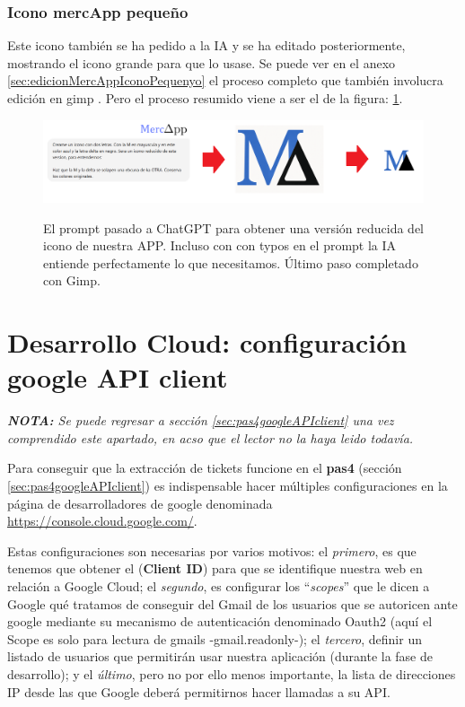 \documentclass[a4paper,12pt]{report}
\begin{document}
	
	\subsubsection{Icono mercApp pequeño}
	\label{sec:iconoMercappPetitMEMORIAPPAL}
	Este icono también se ha pedido a la IA y se ha editado posteriormente, mostrando el icono grande para que lo usase. Se puede ver en el anexo \ref{sec:edicionMercAppIconoPequenyo} el proceso completo que también involucra edición en gimp . Pero el proceso resumido viene a ser el de la figura: \ref{fig:mercappResumit}.
		
		
	\FloatBarrier
	\setlength{\belowcaptionskip}{3pt}
	\begin{figure}[H]
		\centering
		\caption{El prompt pasado a ChatGPT para obtener una versión reducida del icono de nuestra APP. Incluso con con typos en el prompt la IA entiende perfectamente lo que necesitamos. Último paso completado con Gimp.}
		\includegraphics[width=1\linewidth]{img/mercappResumit}
		\label{fig:mercappResumit}
	\end{figure}
	\FloatBarrier
		
		
		
	\section{Desarrollo Cloud: configuración google API client}
	\label{sec:desarrolloCloudGoogleApi}
	
	\noindent \textit{\textbf{NOTA:} Se puede regresar a sección \ref{sec:pas4googleAPIclient} una vez comprendido este apartado, en acso que el lector no la haya leido todavía.}
	
	Para conseguir que la extracción de tickets funcione en el \textbf{pas4} (sección \ref{sec:pas4googleAPIclient}) es indispensable hacer múltiples configuraciones en la página de desarrolladores de google denominada \href{https://console.cloud.google.com/}{https://console.cloud.google.com/}. 
	
	Estas configuraciones son necesarias por varios motivos: el \textit{primero}, es que tenemos que  obtener el (\textbf{Client ID}) para que se identifique nuestra web en relación a Google Cloud; el \textit{segundo}, es configurar los ``\textit{scopes}'' que le dicen a Google qué tratamos de conseguir del Gmail de los usuarios que se autoricen ante google mediante su mecanismo de autenticación denominado Oauth2 (aquí el Scope es solo para lectura de gmails -gmail.readonly-); el \textit{tercero}, definir un listado de usuarios que permitirán usar nuestra aplicación (durante la fase de desarrollo); y el \textit{último}, pero no por ello menos importante, la lista de direcciones IP desde las que Google deberá permitirnos hacer llamadas a su API.
	
\end{document}
